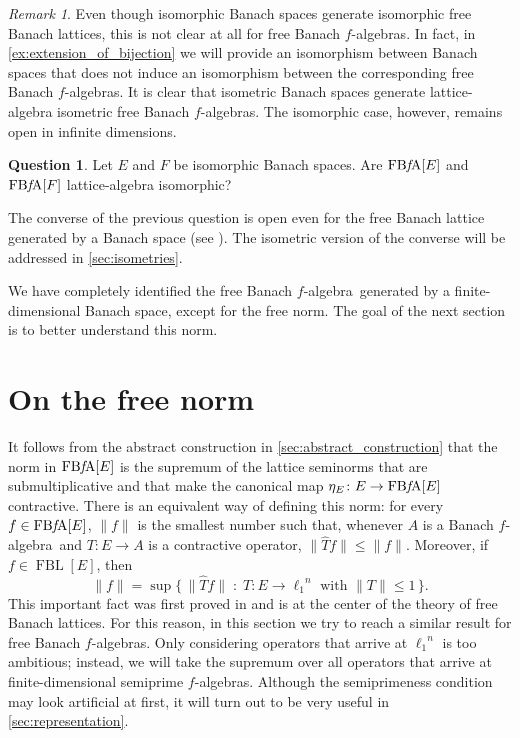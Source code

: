 \documentclass{memo-l}
\theoremstyle{definition}
\newtheorem{question}[theorem]{Question}
\theoremstyle{remark}
\newtheorem{rem}[theorem]{Remark}
\numberwithin{section}{chapter}
\numberwithin{equation}{chapter}
\newcommand{\el}[1]{\ensuremath{\ell_{#1}}}
\newcommand{\falg}{$f\!$-algebra}
\newcommand{\FBFA}[1]{\operatorname{FB{\it f}\!A}[#1]}
\newcommand{\FBL}[1]{\operatorname{FBL}[#1]}
\begin{document}
\begin{rem}
    Even though isomorphic Banach spaces generate isomorphic free
    Banach lattices, this is not clear at all for free Banach
    \falg s. In fact, in \cref{ex:extension_of_bijection} we will
    provide an isomorphism between Banach spaces that does not induce an
    isomorphism between the corresponding free Banach \falg s.
    It is clear that isometric Banach spaces generate lattice-algebra
    isometric free Banach \falg s. The isomorphic case, however,
    remains open in infinite dimensions.
\end{rem}

\begin{question}
    Let $E$ and $F$ be isomorphic Banach spaces. Are $\FBFA E$ and
    $\FBFA F$ lattice-algebra isomorphic?
\end{question}

The converse of the previous question is open even for the free Banach
lattice generated by a Banach space (see \cite[Section
10]{oikhberg_etal2022}). The isometric version of the converse will be
addressed in \cref{sec:isometries}.

We have completely identified the free Banach \falg\ generated by a
finite-dimensional Banach space, except for the free norm. The goal of
the next section is to better understand this norm.

\section{On the free norm}\label{sec:free_norm}

It follows from the abstract construction in \cref{sec:abstract_construction} that the norm in $\FBFA E$ is the supremum of the lattice
seminorms that are submultiplicative and that make the canonical map $\eta
_E\colon E\to \FBFA E$ contractive. There is an equivalent way of
defining this norm: for every $f \in \FBFA E$, $\|f\|$ is the
smallest number such that, whenever $A$ is a Banach
\falg\ and $T\colon E\to A$ is a contractive operator,
$\|\hat{T}f\|\le \|f\|$. Moreover, if $f \in \FBL E$, then
\[
\|f\|=\sup \{\, \|\hat{T}f\| \;:\; T\colon E\to \el 1^{n}\text{ with } \|T\|\le 1 \, \}.
\]
This important fact was first proved in
\cite{aviles_rodriguez_tradacete2018} and is at the center of the
theory of free Banach lattices. For this reason, in this section we
try to reach a similar result for free Banach \falg s. Only
considering operators that arrive at $\el 1^{n}$ is too ambitious;
instead, we will take the supremum over all operators that arrive at
finite-dimensional semiprime \falg s. Although the semiprimeness
condition may look artificial at first, it will turn out to be
very useful in \cref{sec:representation}.
\end{document}
